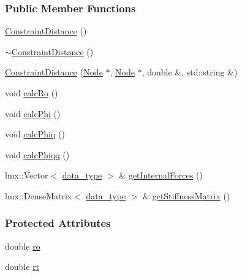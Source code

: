 \subsubsection*{Public Member Functions}
\begin{DoxyCompactItemize}
\item 
\hyperlink{classmknix_1_1_constraint_distance_ad89b1d56b296625e72fe0bcf4cea3c5c}{Constraint\-Distance} ()
\item 
\hyperlink{classmknix_1_1_constraint_distance_aa39735f682295e2c7b839fddb9eba545}{$\sim$\-Constraint\-Distance} ()
\item 
\hyperlink{classmknix_1_1_constraint_distance_adc9113e52374f275b1b79bfdca72b971}{Constraint\-Distance} (\hyperlink{classmknix_1_1_node}{Node} $\ast$, \hyperlink{classmknix_1_1_node}{Node} $\ast$, double \&, std\-::string \&)
\item 
void \hyperlink{classmknix_1_1_constraint_distance_a32df0e5f0198ce5c7871e2b6a5cafb7c}{calc\-Ro} ()
\item 
void \hyperlink{classmknix_1_1_constraint_distance_ad838af34d5ada5ba2f4ce559a472e16a}{calc\-Phi} ()
\item 
void \hyperlink{classmknix_1_1_constraint_distance_a6fa6c37266c01a1e8f577418dd886037}{calc\-Phiq} ()
\item 
void \hyperlink{classmknix_1_1_constraint_distance_ad4d1eb206239508f7f2f5b4d26b957eb}{calc\-Phiqq} ()
\item 
lmx\-::\-Vector$<$ \hyperlink{namespacemknix_a16be4b246fbf2cceb141e3a179111020}{data\-\_\-type} $>$ \& \hyperlink{classmknix_1_1_constraint_distance_aae757ba28e181259a196fbc0a1e8bfaf}{get\-Internal\-Forces} ()
\item 
lmx\-::\-Dense\-Matrix$<$ \hyperlink{namespacemknix_a16be4b246fbf2cceb141e3a179111020}{data\-\_\-type} $>$ \& \hyperlink{classmknix_1_1_constraint_distance_a847365545dcef34ee44bbadd20d819bf}{get\-Stiffness\-Matrix} ()
\end{DoxyCompactItemize}
\subsubsection*{Protected Attributes}
\begin{DoxyCompactItemize}
\item 
double \hyperlink{classmknix_1_1_constraint_distance_a2d4a4e3c3b75b23f63a772b71c4badaa}{ro}
\item 
double \hyperlink{classmknix_1_1_constraint_distance_ae4054619a2e3205079c4911ad69db4eb}{rt}
\end{DoxyCompactItemize}


